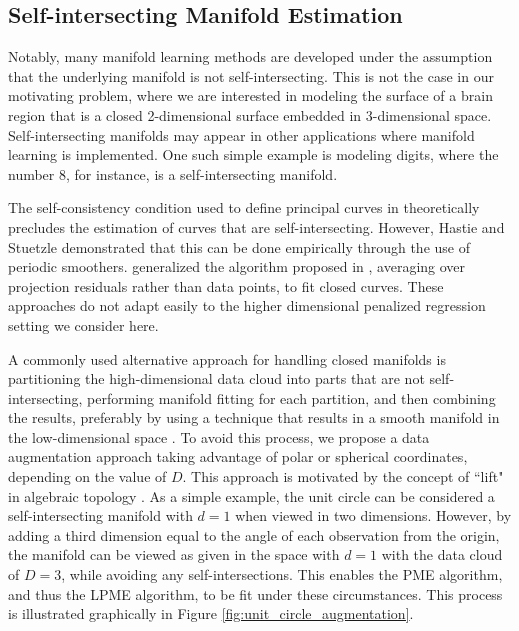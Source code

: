 \documentclass[12pt]{article}
\theoremstyle{definition}
\begin{document}
\subsection{Self-intersecting Manifold Estimation}\label{ss:selfInt}

Notably, many manifold learning methods are developed under the assumption that the underlying manifold is not self-intersecting. This is not the case in our motivating problem, where we are interested in modeling the surface of a brain region that is a closed 2-dimensional surface embedded in 3-dimensional space. Self-intersecting manifolds may appear in other applications where manifold learning is implemented. One such simple example is modeling digits, where the number 8, for instance, is a self-intersecting manifold.

The self-consistency condition used to define principal curves in \cite{hastiePrincipalCurves1989} theoretically precludes the estimation of curves that are self-intersecting. However, Hastie and Stuetzle demonstrated that this can be done empirically through the use of periodic smoothers. \cite{banfieldIceFloeIdentification1992} generalized the algorithm proposed in \cite{hastiePrincipalCurves1989}, averaging over projection residuals rather than data points, to fit closed curves. These approaches do not adapt easily to the higher dimensional penalized regression setting we consider here.

A commonly used alternative approach for handling closed manifolds is partitioning the high-dimensional data cloud into parts that are not self-intersecting, performing manifold fitting for each partition, and then combining the results, preferably by using a technique that results in a smooth manifold in the low-dimensional space \citep[e.g.][]{mengPrincipalManifoldEstimation2021}. To avoid this process, we propose a data augmentation approach taking advantage of polar or spherical coordinates, depending on the value of $D$. This approach is motivated by the concept of ``lift" in algebraic topology \citep[sec. 1.1]{hatcher2002algebraic}. As a simple example, the unit circle can be considered a self-intersecting manifold with $d = 1$ when viewed in two dimensions. However, by adding a third dimension equal to the angle of each observation from the origin, the manifold can be viewed as given in the space with $d = 1$ with the data cloud of $D = 3$, while avoiding any self-intersections. This enables the PME algorithm, and thus the LPME algorithm, to be fit under these circumstances. This process is illustrated graphically in Figure \ref{fig:unit_circle_augmentation}.
\end{document}
